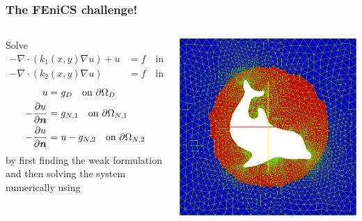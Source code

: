\begin{frame}[shrink=20,fragile]
  \frametitle{The FEniCS challenge!}
  \begin{columns}[c]
    \begin{column}{0.5\textwidth}
    Solve
          \vspace{-1em}
          \begin{align*}
            -\nabla \cdot (k_1(x,y) \nabla u) + u  &= f \quad \text{in
          } \Omega_1 \\
            -\nabla \cdot (k_2(x,y) \nabla u) &= f \quad \text{in }
              \Omega_2 
          \end{align*}
          \vspace{-2.0em}
          \begin{align*}
                    u &= g_D \quad \text{on } \partial \Omega_D \\
            -\dfrac{\partial u}{\partial \boldsymbol{n}} &= g_{N,1} \quad \text{on }
            \partial \Omega_{N,1} \\
            -\dfrac{\partial u}{\partial \boldsymbol{n}} &= u - g_{N,2} \quad \text{on }
            \partial \Omega_{N,2}
          \end{align*}
    by first finding the weak formulation and then solving the system
    numerically using 
    \end{column}
    \begin{column}{0.5\textwidth}
      \begin{center}
        \includegraphics[width=1.0\textwidth]{png/poisson_5_subdomains.png}

\end{center}
\end{column}
\end{columns}
\end{frame}
